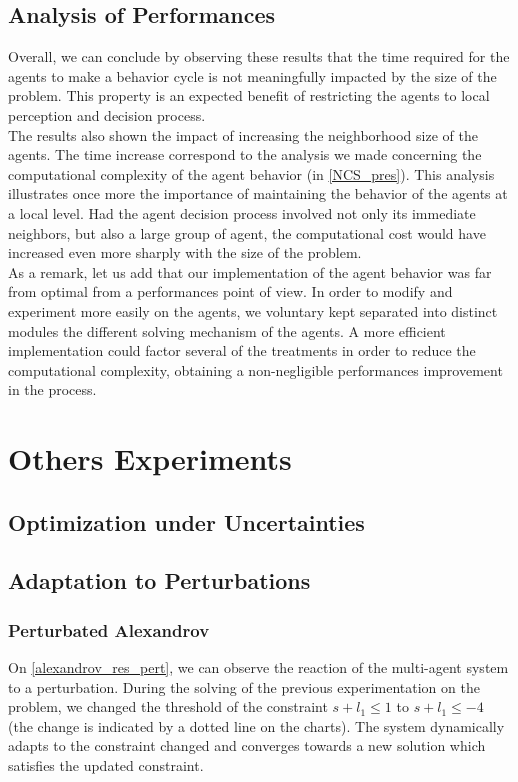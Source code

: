 \section{Analysis of Performances}

Overall, we can conclude by observing these results that the time required for the agents to make a behavior cycle is not meaningfully impacted by the size of the problem. This property is an expected benefit of restricting the agents to local perception and decision process.\\
The results also shown the impact of increasing the neighborhood size of the agents. The time increase correspond to the analysis we made concerning the computational complexity of the agent behavior (in \ref{NCS_pres}).  This analysis illustrates once more the importance of maintaining the behavior of the agents at a local level. Had the agent decision process involved not only its immediate neighbors, but also a large group of agent, the computational cost would have increased even more sharply with the size of the problem.\\
As a remark, let us add that our implementation of the agent behavior was far from optimal from a performances point of view. In order to modify and experiment more easily on the agents, we voluntary kept separated into distinct modules the different solving mechanism of the agents. A more efficient implementation could factor several of the treatments in order to reduce the computational complexity, obtaining a non-negligible performances improvement in the process.

\chapter{Others Experiments}

\section{Optimization under Uncertainties}

\section{Adaptation to Perturbations}

\subsection{Perturbated Alexandrov}
 
On \figurename \ref{alexandrov_res_pert}, we can observe the reaction of the multi-agent system to a perturbation. During the solving of the previous experimentation on the problem, we changed the threshold of the constraint $s + l_1 \leq 1$ to $s + l_1 \leq -4$ (the change is indicated by a dotted line on the charts). The system dynamically adapts to the constraint changed and converges towards a new solution which satisfies the updated constraint.

